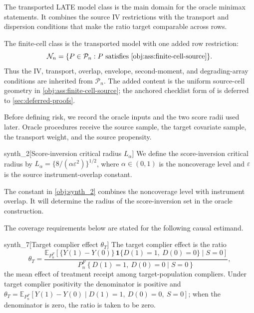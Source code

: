 The transported LATE model class  is the main domain for the oracle minimax statements.  It combines the source IV restrictions with the transport and dispersion conditions that make the ratio target comparable across rows.

The finite-cell class is the transported model with one added row restriction:
\[
\mathcal N_n=\{P\in\mathcal P_n:P\text{ satisfies }\cref{obj:ass:finite-cell-source}\}.
\]
Thus the IV, transport, overlap, envelope, second-moment, and degrading-array conditions are inherited from \(\mathcal P_n\).  The added content is the uniform source-cell geometry in \cref{obj:ass:finite-cell-source}; the anchored checklist form of  is deferred to \cref{sec:deferred-proofs}.

Before defining risk, we record the oracle inputs and the two score radii used later.  Oracle procedures receive the source sample, the target covariate sample, the transport weight, and the source propensity.

\begin{definitionv}{synth_2}[Score-inversion critical radius $L_\alpha$]
We define the score-inversion critical radius by \(L_\alpha=\{8/(\alpha\varepsilon^2)\}^{1/2}\), where \(\alpha\in(0,1)\) is the noncoverage level and \(\varepsilon\) is the source instrument-overlap constant.
\end{definitionv}

The constant in \cref{obj:synth_2} combines the noncoverage level  with instrument overlap.  It will determine the radius of the score-inversion set in the oracle construction.

The coverage requirements below are stated for the following causal estimand.

\begin{definitionv}{synth_7}[Target complier effect $\theta_T$]
The target complier effect is the ratio
\[
\theta_T
=
\frac{\mathbb E_{P_n^F}\!\left[\{Y(1)-Y(0)\}\,\mathbf 1\{D(1)=1,\ D(0)=0\}\mid S=0\right]}
     {P_n^F\!\left\{D(1)=1,\ D(0)=0\mid S=0\right\}},
\]
the mean effect of treatment receipt among target-population compliers.  Under target complier positivity the denominator is positive and \(\theta_T=\mathbb E_{P_n^F}\!\left[Y(1)-Y(0)\mid D(1)=1,\ D(0)=0,\ S=0\right]\); when the denominator is zero, the ratio is taken to be zero.
\end{definitionv}

